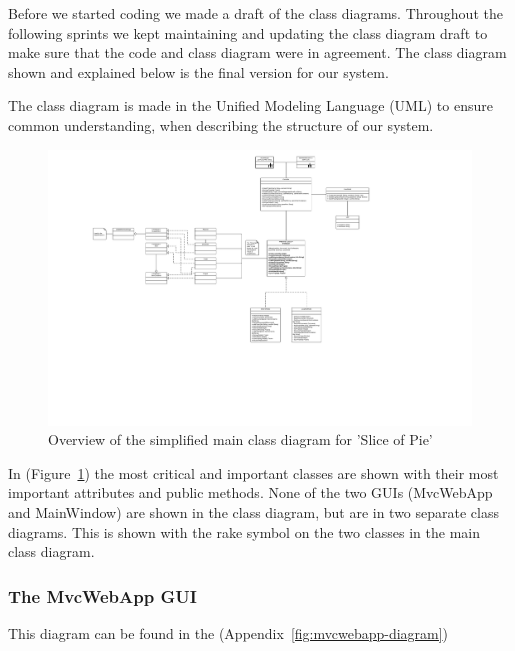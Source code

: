 Before we started coding we made a draft of the class diagrams. Throughout the following sprints we kept maintaining and updating the class diagram
draft to make sure that the code and class diagram were in agreement. The class diagram shown and explained below is the final version for our
system.

The class diagram is made in the Unified Modeling Language (UML) to ensure common understanding, when describing the structure of our system.

\begin{figure}[htb]
    \begin{center}
        \includegraphics[width=1\textwidth]{Software_design/graphics/mainClassDiagram.png}
        \caption{Overview of the simplified main class diagram for 'Slice of Pie'}
        \label{fig:design-class_diagram}
    \end{center}
\end{figure}

In (Figure~\ref{fig:design-class_diagram}) the most critical and important classes are shown with their most important attributes and public methods.
None of the two GUIs (MvcWebApp and MainWindow) are shown in the class diagram, but are in two separate class diagrams. This is shown with the rake
symbol on the two classes in the main class diagram.


\subsubsection{The MvcWebApp GUI}

This diagram can be found in the (Appendix~\ref{fig:mvcwebapp-diagram})
